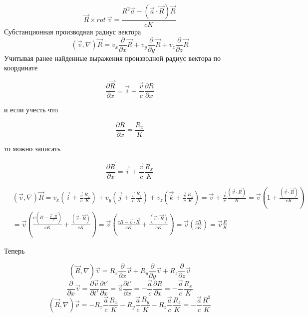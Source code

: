 \documentclass[11pt]{article}
\begin{document}
\[\overrightarrow{R}\times rot\ \overrightarrow{v}=\frac{{{R}^{2}}\overrightarrow{a}-\left( \overrightarrow{a}\cdot \overrightarrow{R} \right)\overrightarrow{R}}{cK}\]
Субстанционная производная радиус вектора
\[\left( \overrightarrow{v},\nabla  \right)\overrightarrow{R}={{v}_{x}}\frac{\partial }{\partial x}\overrightarrow{R}+{{v}_{y}}\frac{\partial }{\partial y}\overrightarrow{R}+{{v}_{z}}\frac{\partial }{\partial z}\overrightarrow{R}\]
Учитывая ранее найденные выражения производной радиус вектора по
координате

\[\frac{\partial \overrightarrow{R}}{\partial x}=\overrightarrow{i}+\frac{\overrightarrow{v}}{c}\frac{\partial R}{\partial x}\]

и если учесть что

\[\frac{\partial R}{\partial x}=\frac{{{R}_{x}}}{K}\]

то можно записать

\[\frac{\partial \overrightarrow{R}}{\partial x}=\overrightarrow{i}+\frac{\overrightarrow{v}}{c}\frac{{{R}_{x}}}{K}\]

\[\begin{align}
  & \left( \overrightarrow{v},\nabla  \right)\overrightarrow{R}={{v}_{x}}\left( \overrightarrow{i}+\frac{\overrightarrow{v}}{c}\frac{{{R}_{x}}}{K} \right)+{{v}_{y}}\left( \overrightarrow{j}+\frac{\overrightarrow{v}}{c}\frac{{{R}_{y}}}{K} \right)+{{v}_{z}}\left( \overrightarrow{k}+\frac{\overrightarrow{v}}{c}\frac{{{R}_{z}}}{K} \right)=\overrightarrow{v}+\frac{\overrightarrow{v}}{c}\frac{\left( \overrightarrow{v}\cdot \overrightarrow{R} \right)}{K}=\overrightarrow{v}\left( 1+\frac{\left( \overrightarrow{v}\cdot \overrightarrow{R} \right)}{cK} \right) \\ 
 & =\overrightarrow{v}\left( \frac{c\left( R-\frac{\overrightarrow{v}\cdot \overrightarrow{R}}{c} \right)}{cK}+\frac{\left( \overrightarrow{v}\cdot \overrightarrow{R} \right)}{cK} \right)=\overrightarrow{v}\left( \frac{cR-\overrightarrow{v}\cdot \overrightarrow{R}}{cK}+\frac{\left( \overrightarrow{v}\cdot \overrightarrow{R} \right)}{cK} \right)=\overrightarrow{v}\left( \frac{cR}{cK} \right)=\overrightarrow{v}\frac{R}{K}
\end{align}\]

Теперь

\[\left( \overrightarrow{R},\nabla  \right)\overrightarrow{v}={{R}_{x}}\frac{\partial }{\partial x}\overrightarrow{v}+{{R}_{y}}\frac{\partial }{\partial y}\overrightarrow{v}+{{R}_{z}}\frac{\partial }{\partial z}\overrightarrow{v}\]
\[\frac{\partial }{\partial x}\overrightarrow{v}=\frac{\partial \overrightarrow{v}}{\partial t'}\frac{\partial t'}{\partial x}=\overrightarrow{a}\frac{\partial t'}{\partial x}=-\frac{\overrightarrow{a}}{c}\frac{\partial R}{\partial x}=-\frac{\overrightarrow{a}}{c}\frac{{{R}_{x}}}{K}\]
\[\left( \overrightarrow{R},\nabla  \right)\overrightarrow{v}=-{{R}_{x}}\frac{\overrightarrow{a}}{c}\frac{{{R}_{x}}}{K}-{{R}_{y}}\frac{\overrightarrow{a}}{c}\frac{{{R}_{y}}}{K}-{{R}_{z}}\frac{\overrightarrow{a}}{c}\frac{{{R}_{z}}}{K}=-\frac{\overrightarrow{a}}{c}\frac{{{R}^{2}}}{K}\]
\end{document}
